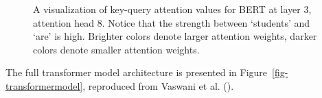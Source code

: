 \documentclass[
  12pt,
  letterpaper,
]{scrreprt}
\begin{document}
\begin{figure}[htbp]

\caption{\label{fig-attentionplot}A visualization of key-query attention
values for BERT at layer 3, attention head 8. Notice that the strength
between `students' and `are' is high. Brighter colors denote larger
attention weights, darker colors denote smaller attention weights.}


\end{figure}%

The full transformer model architecture is presented in
Figure~\ref{fig-transformermodel}, reproduced from Vaswani et al.
().
\end{document}

